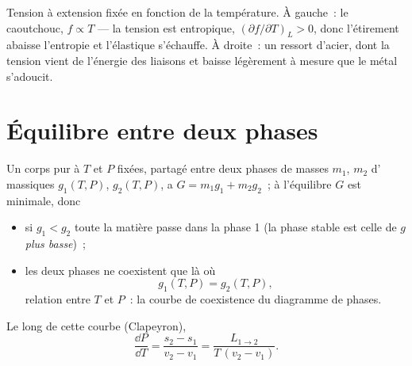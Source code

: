\begin{omfigure}

{\small Tension à extension fixée en fonction de la température. À gauche~: le caoutchouc,
$f \propto T$ --- la tension est entropique, $(\partial f/\partial T)_L > 0$,
donc l'étirement abaisse l'entropie et l'élastique s'échauffe. À droite~: un ressort
d'acier, dont la tension vient de l'énergie des liaisons et baisse légèrement
à mesure que le métal s'adoucit.}
\end{omfigure}

\section{Équilibre entre deux phases}

\begin{theorem}\label{thm:b2:thermodynamic-potentials:coexistence}
Un corps pur à $T$ et $P$ fixées, partagé entre deux phases de
masses $m_1$, $m_2$ d' massiques $g_1(T,P)$,
$g_2(T,P)$, a $G = m_1g_1 + m_2g_2$~; à l'équilibre $G$ est minimale, donc
\begin{itemize}
\item si $g_1 < g_2$ toute la matière passe dans la phase 1 (la phase stable
      est celle de $g$ \emph{plus basse})~;
\item les deux phases ne coexistent que là où
      \[
      g_1(T,P) = g_2(T,P) ,
      \]
      relation entre $T$ et $P$~: la courbe de coexistence du diagramme
      de phases.
\end{itemize}
Le long de cette courbe (Clapeyron),
\[
\frac{\dd P}{\dd T} = \frac{s_2 - s_1}{v_2 - v_1} = \frac{L_{1\to2}}{T\,(v_2 - v_1)} .
\]
\end{theorem}

